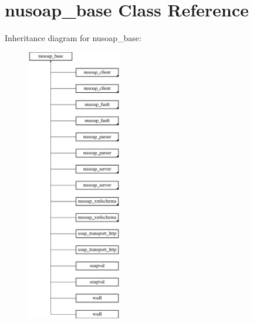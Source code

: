 \hypertarget{classnusoap__base}{}\section{nusoap\+\_\+base Class Reference}
\label{classnusoap__base}
Inheritance diagram for nusoap\+\_\+base\+:\begin{figure}[H]
\begin{center}
\leavevmode
\includegraphics[height=12.000000cm]{classnusoap__base}
\end{center}
\end{figure}
